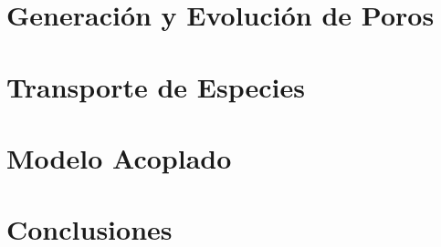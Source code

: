 \documentclass[11pt,a4paper,twoside]{tesis}
\begin{document}
\chapter{Generación y Evolución de Poros}

\chapter{Transporte de Especies}

\chapter{Modelo Acoplado}

\chapter{Conclusiones}

\backmatter
%
\end{document}
